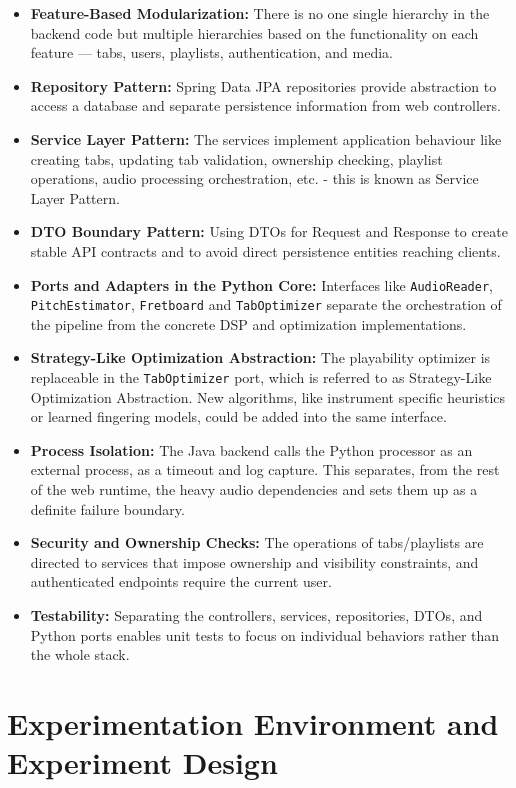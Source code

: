 \documentclass[a4paper, 12pt, titlepage]{article}
\begin{document}
\begin{itemize}
    \item \textbf{Feature-Based Modularization:} There is no one single hierarchy in the backend code but multiple hierarchies based on the functionality on each feature — tabs, users, playlists, authentication, and media.
    \item \textbf{Repository Pattern:} Spring Data JPA repositories provide abstraction to access a database and separate persistence information from web controllers.
    \item \textbf{Service Layer Pattern:} The services implement application behaviour like creating tabs, updating tab validation, ownership checking, playlist operations, audio processing orchestration, etc. - this is known as Service Layer Pattern.
    \item \textbf{DTO Boundary Pattern:} Using DTOs for Request and Response to create stable API contracts and to avoid direct persistence entities reaching clients.
    \item \textbf{Ports and Adapters in the Python Core:} Interfaces like \texttt{AudioReader}, \texttt{PitchEstimator}, \texttt{Fretboard} and \texttt{TabOptimizer} separate the orchestration of the pipeline from the concrete DSP and optimization implementations.
    \item \textbf{Strategy-Like Optimization Abstraction:} The playability optimizer is replaceable in the \texttt{TabOptimizer} port, which is referred to as Strategy-Like Optimization Abstraction. New algorithms, like instrument specific heuristics or learned fingering models, could be added into the same interface.
    \item \textbf{Process Isolation:} The Java backend calls the Python processor as an external process, as a timeout and log capture. This separates, from the rest of the web runtime, the heavy audio dependencies and sets them up as a definite failure boundary.
    \item \textbf{Security and Ownership Checks:} The operations of tabs/playlists are directed to services that impose ownership and visibility constraints, and authenticated endpoints require the current user.
    \item \textbf{Testability:} Separating the controllers, services, repositories, DTOs, and Python ports enables unit tests to focus on individual behaviors rather than the whole stack.
\end{itemize}

\newpage
\section{Experimentation Environment and Experiment Design}
\label{sec:experiments}
\end{document}
